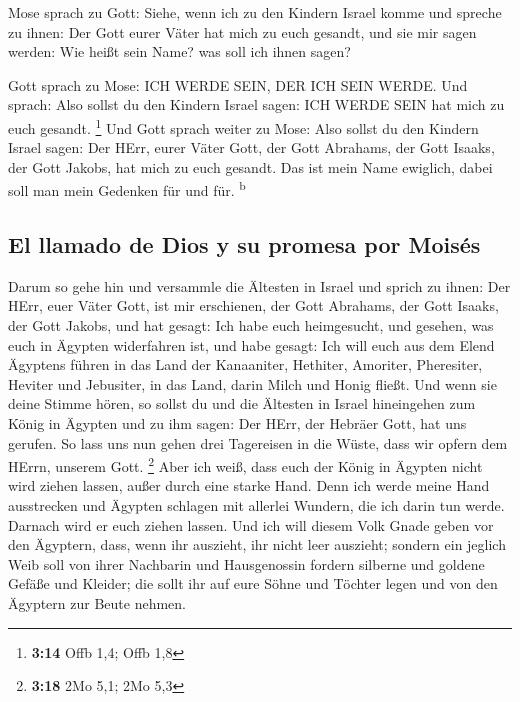  Mose sprach zu Gott: Siehe, wenn ich zu den Kindern
Israel komme und spreche zu ihnen: Der Gott eurer Väter hat mich zu euch
gesandt, und sie mir sagen werden: Wie heißt sein Name? was soll ich
ihnen sagen?

 Gott sprach zu Mose: ICH WERDE SEIN, DER ICH SEIN WERDE.
Und sprach: Also sollst du den Kindern Israel sagen: ICH WERDE SEIN hat
mich zu euch gesandt. \footnote{\textbf{3:14} Offb 1,4; Offb 1,8}
 Und Gott sprach weiter zu Mose: Also sollst du den
Kindern Israel sagen: Der HErr, eurer Väter Gott, der Gott Abrahams, der
Gott Isaaks, der Gott Jakobs, hat mich zu euch gesandt. Das ist mein
Name ewiglich, dabei soll man mein Gedenken für und für.
\textsuperscript{b}

\hypertarget{el-llamado-de-dios-y-su-promesa-por-moisuxe9s}{%
\subsection{El llamado de Dios y su promesa por
Moisés}\label{el-llamado-de-dios-y-su-promesa-por-moisuxe9s}}

 Darum so gehe hin und versammle die Ältesten in Israel
und sprich zu ihnen: Der HErr, euer Väter Gott, ist mir erschienen, der
Gott Abrahams, der Gott Isaaks, der Gott Jakobs, und hat gesagt: Ich
habe euch heimgesucht, und gesehen, was euch in Ägypten widerfahren ist,
 und habe gesagt: Ich will euch aus dem Elend Ägyptens
führen in das Land der Kanaaniter, Hethiter, Amoriter, Pheresiter,
Heviter und Jebusiter, in das Land, darin Milch und Honig fließt.
 Und wenn sie deine Stimme hören, so sollst du und die
Ältesten in Israel hineingehen zum König in Ägypten und zu ihm sagen:
Der HErr, der Hebräer Gott, hat uns gerufen. So lass uns nun gehen drei
Tagereisen in die Wüste, dass wir opfern dem HErrn, unserem Gott.
\footnote{\textbf{3:18} 2Mo 5,1; 2Mo 5,3}  Aber ich weiß,
dass euch der König in Ägypten nicht wird ziehen lassen, außer durch
eine starke Hand.  Denn ich werde meine Hand ausstrecken
und Ägypten schlagen mit allerlei Wundern, die ich darin tun werde.
Darnach wird er euch ziehen lassen.  Und ich will diesem
Volk Gnade geben vor den Ägyptern, dass, wenn ihr auszieht, ihr nicht
leer auszieht;  sondern ein jeglich Weib soll von ihrer
Nachbarin und Hausgenossin fordern silberne und goldene Gefäße und
Kleider; die sollt ihr auf eure Söhne und Töchter legen und von den
Ägyptern zur Beute nehmen.

